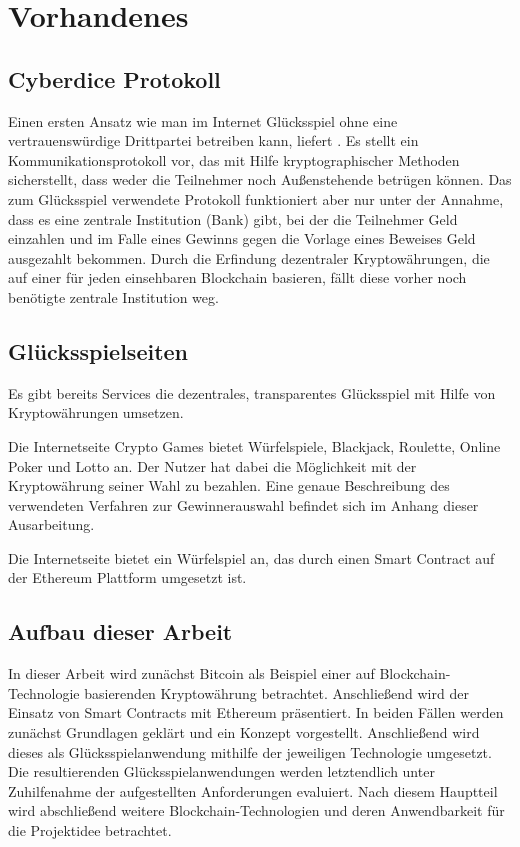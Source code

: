 \section{Vorhandenes}

\subsection{Cyberdice Protokoll}

Einen ersten Ansatz wie man im Internet Glücksspiel ohne eine vertrauenswürdige Drittpartei betreiben kann, liefert \cite{cyberdice_paper}. Es stellt ein Kommunikationsprotokoll vor, das mit Hilfe kryptographischer Methoden sicherstellt, dass weder die Teilnehmer noch Außenstehende betrügen können. Das zum Glücksspiel verwendete Protokoll funktioniert aber nur unter der Annahme, dass es eine zentrale Institution (Bank) gibt, bei der die Teilnehmer Geld einzahlen und im Falle eines Gewinns gegen die Vorlage eines Beweises Geld ausgezahlt bekommen.
\space
Durch die Erfindung dezentraler Kryptowährungen, die auf einer für jeden einsehbaren Blockchain basieren, fällt diese vorher noch benötigte zentrale Institution weg.


\subsection{Glücksspielseiten}


Es gibt bereits Services die dezentrales, transparentes Glücksspiel mit Hilfe von Kryptowährungen umsetzen.

Die Internetseite Crypto Games \cite{crypto_games} bietet Würfelspiele, Blackjack, Roulette, Online Poker und Lotto an. Der Nutzer hat dabei die Möglichkeit mit der Kryptowährung seiner Wahl zu bezahlen. Eine genaue Beschreibung des verwendeten Verfahren zur Gewinnerauswahl befindet sich im Anhang dieser Ausarbeitung.

Die Internetseite \cite{vdice} bietet ein Würfelspiel an, das durch einen Smart Contract auf der Ethereum Plattform umgesetzt ist.

\subsection{Aufbau dieser Arbeit}
In dieser Arbeit wird zunächst Bitcoin als Beispiel einer auf Blockchain-Technologie basierenden Kryptowährung betrachtet. Anschließend wird der Einsatz von Smart Contracts mit Ethereum präsentiert. In beiden Fällen werden zunächst Grundlagen geklärt und ein Konzept vorgestellt. Anschließend wird dieses als Glücksspielanwendung mithilfe der jeweiligen Technologie umgesetzt. Die resultierenden Glücksspielanwendungen werden letztendlich unter Zuhilfenahme der aufgestellten Anforderungen evaluiert. Nach diesem Hauptteil wird abschließend weitere Blockchain-Technologien und deren Anwendbarkeit für die Projektidee betrachtet.